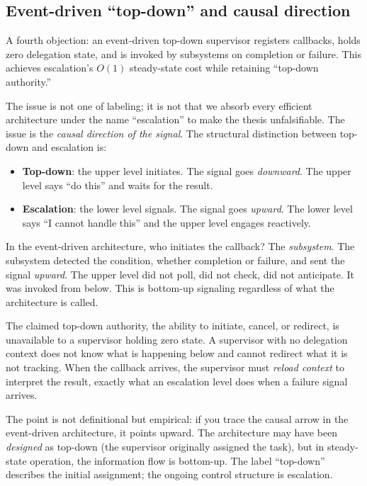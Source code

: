\documentclass[11pt]{article}
\theoremstyle{definition}
\begin{document}
\subsection{Event-driven ``top-down'' and causal direction}

A fourth objection: an event-driven top-down supervisor registers
callbacks, holds zero delegation state, and is invoked by subsystems on
completion or failure. This achieves escalation's $O(1)$ steady-state
cost while retaining ``top-down authority.''

The issue is not one of labeling; it is not that we absorb every
efficient architecture under the name ``escalation'' to make the thesis
unfalsifiable. The issue is the \emph{causal direction of the signal}.
The structural distinction between top-down and escalation is:

\begin{itemize}
\item \textbf{Top-down}: the upper level initiates. The signal goes
   \emph{downward}. The upper level says ``do this'' and waits for the
   result.
\item \textbf{Escalation}: the lower level signals. The signal goes
   \emph{upward}. The lower level says ``I cannot handle this'' and the
   upper level engages reactively.
\end{itemize}

In the event-driven architecture, who initiates the callback? The
\emph{subsystem}. The subsystem detected the condition, whether
completion or failure, and sent the signal \emph{upward}. The upper
level did not poll, did not check, did not anticipate. It was invoked
from below. This is bottom-up signaling regardless of what the
architecture is called.

The claimed top-down authority, the ability to initiate, cancel, or
redirect, is unavailable to a supervisor holding zero state. A
supervisor with no delegation context does not know what is happening
below and cannot redirect what it is not tracking. When the callback
arrives, the supervisor must \emph{reload context} to interpret the
result, exactly what an escalation level does when a failure signal
arrives.

The point is not definitional but empirical: if you trace the causal
arrow in the event-driven architecture, it points upward. The
architecture may have been \emph{designed} as top-down (the supervisor
originally assigned the task), but in steady-state operation, the
information flow is bottom-up. The label ``top-down'' describes the
initial assignment; the ongoing control structure is escalation.
\end{document}
